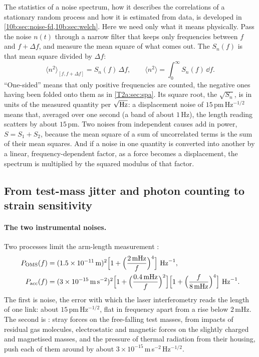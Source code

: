 The statistics of a noise spectrum, how it describes the correlations of a stationary random process and how it is estimated from data, is developed in \cref{10b:sec:noise-fd,10b:sec:welch}. Here we need only what it means physically. Pass the noise $n(t)$ through a narrow filter that keeps only frequencies between $f$ and $f+\Delta f$, and measure the mean square of what comes out. The  $S_n(f)$ is that mean square divided by $\Delta f$:
\begin{equation}
  \big\langle n^2\big\rangle_{[f,f+\Delta f]}=S_n(f)\,\Delta f,\qquad
  \big\langle n^2\big\rangle=\int_0^\infty S_n(f)\,\dd f .
  \label{T2g:eq:band-power}
\end{equation}
``One-sided'' means that only positive frequencies are counted, the negative ones having been folded onto them as in \cref{T2a:sec:spa}. Its square root, the  $\sqrt{S_n}$, is in units of the measured quantity per $\sqrt{\rm Hz}$: a displacement noise of $15$\,pm\,Hz$^{-1/2}$ means that, averaged over one second (a band of about $1$\,Hz), the length reading scatters by about $15$\,pm. Two noises from independent causes add in power, $S=S_1+S_2$, because the mean square of a sum of uncorrelated terms is the sum of their mean squares. And if a noise in one quantity is converted into another by a linear, frequency-dependent factor, as a force becomes a displacement, the spectrum is multiplied by the squared modulus of that factor.

\subsection{From test-mass jitter and photon counting to strain sensitivity}

\paragraph{The two instrumental noises.}
Two processes limit the arm-length measurement \cite[eqs.~(10)--(11)]{Robson2019}:
\begin{align}
  P_{\rm OMS}(f)&=(1.5\times10^{-11}\,{\rm m})^2\Big[1+\Big(\frac{2\,{\rm mHz}}{f}\Big)^4\Big]\ {\rm Hz}^{-1},\nonumber\\
  P_{\rm acc}(f)&=(3\times10^{-15}\,{\rm m\,s^{-2}})^2\Big[1+\Big(\frac{0.4\,{\rm mHz}}{f}\Big)^2\Big]\Big[1+\Big(\frac{f}{8\,{\rm mHz}}\Big)^4\Big]\ {\rm Hz}^{-1}.\label{T2a:eq:lisa-noise}
\end{align}
The first is  noise, the error with which the laser interferometry reads the length of one link: about $15$\,pm\,Hz$^{-1/2}$, flat in frequency apart from a rise below $2$\,mHz. The second is : stray forces on the free-falling test masses, from impacts of residual gas molecules, electrostatic and magnetic forces on the slightly charged and magnetised masses, and the pressure of thermal radiation from their housing, push each of them around by about $3\times10^{-15}$\,m\,s$^{-2}$\,Hz$^{-1/2}$.


